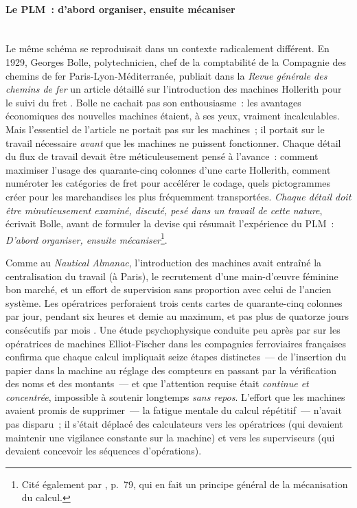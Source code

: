 \paragraph{Le PLM~: \og d'abord organiser, ensuite mécaniser\fg{}}\mbox{}\\
Le même schéma se reproduisait dans un contexte radicalement différent. En 1929, Georges Bolle, polytechnicien, chef de la comptabilité de la Compagnie des chemins de fer Paris-Lyon-Méditerranée, publiait dans la \emph{Revue générale des chemins de fer} un article détaillé sur l'introduction des machines Hollerith pour le suivi du fret \parencite{bolle_utilisation_1929}. Bolle ne cachait pas son enthousiasme~: les avantages économiques des nouvelles machines étaient, à ses yeux, \og vraiment incalculables\fg{}. Mais l'essentiel de l'article ne portait pas sur les machines~; il portait sur le travail nécessaire \emph{avant} que les machines ne puissent fonctionner. Chaque détail du flux de travail devait être méticuleusement pensé à l'avance~: comment maximiser l'usage des quarante-cinq colonnes d'une carte Hollerith, comment numéroter les catégories de fret pour accélérer le codage, quels pictogrammes créer pour les marchandises les plus fréquemment transportées. \og \emph{Chaque détail doit être minutieusement examiné, discuté, pesé dans un travail de cette nature}\fg{}, écrivait Bolle, avant de formuler la devise qui résumait l'expérience du PLM~: \og \emph{D'abord organiser, ensuite mécaniser}\fg{}\footnote{Cité également par \textcite{couffignal_machines_1933}, p.~79, qui en fait un principe général de la mécanisation du calcul.}.

Comme au \emph{Nautical Almanac}, l'introduction des machines avait entraîné la centralisation du travail (à Paris), le recrutement d'une main-d'œuvre féminine bon marché, et un effort de supervision sans proportion avec celui de l'ancien système. Les opératrices perforaient trois cents cartes de quarante-cinq colonnes par jour, pendant six heures et demie au maximum, et pas plus de quatorze jours consécutifs par mois \parencite{bolle_utilisation_1929}. Une étude psychophysique conduite peu après par \textcite{lahy_selection_1931} sur les opératrices de machines Elliot-Fischer dans les compagnies ferroviaires françaises confirma que chaque calcul impliquait seize étapes distinctes~--- de l'insertion du papier dans la machine au réglage des compteurs en passant par la vérification des noms et des montants~--- et que l'attention requise était \og \emph{continue et concentrée}\fg{}, impossible à soutenir longtemps \og \emph{sans repos}\fg{}. L'effort que les machines avaient promis de supprimer~--- la fatigue mentale du calcul répétitif~--- n'avait pas disparu~; il s'était déplacé des calculateurs vers les opératrices (qui devaient maintenir une vigilance constante sur la machine) et vers les superviseurs (qui devaient concevoir les séquences d'opérations). %

